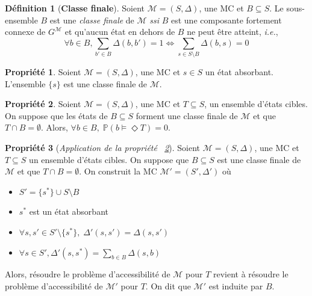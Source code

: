 \documentclass[12pt,a4paper]{report}
\theoremstyle{definition}%
\newtheorem{definition}{Définition}[chapter]
\newtheorem{propriete}{Propriété}[chapter]
\theoremstyle{remark}
\newcommand{\ssi}{\textit{ssi} }
\newcommand{\ie}{\textit{i.e.}, }
\let\labelitemi\labelitemii
\begin{document}
\begin{definition}[\textbf{Classe finale}]
	Soient $\mathcal{M} = (S, \Delta)$, une MC et $B \subseteq S$. Le sous-ensemble $B$ est une \textit{classe finale} de $\mathcal{M}$ \ssi $B$ est une composante fortement connexe de $G^\mathcal{M}$ et qu'aucun état en dehors de $B$ ne peut être atteint, \ie
	\[\forall b \in B, \sum_{b' \in B} \Delta(b, b') = 1 \iff \sum_{s \in S \setminus B} \Delta(b, s) = 0\]
\end{definition}

\begin{propriete}
		Soient $\mathcal{M}=(S, \Delta)$, une MC et $s \in S$ un état absorbant. L'ensemble $\{s\}$ est une classe finale de $\mathcal{M}$.
\end{propriete}

\begin{propriete}\label{BSCC-tip1}
	Soient $\mathcal{M} = (S, \Delta)$, une MC et $T \subseteq S$, un ensemble d'états cibles. On suppose que les états de $B \subseteq S$ forment une classe finale de $\mathcal{M}$ et que $T \cap B = \emptyset$. Alors, $\forall b \in B, \; \mathbb{P}(b \models \Diamond T) = 0$.
\end{propriete}

\begin{propriete}[\textit{Application de la propriété ~\ref{BSCC-tip1}}]\label{Bscc-application} Soient $\mathcal{M} = (S, \Delta)$, une MC et $T \subseteq S$ un ensemble d'états cibles. On suppose que $B \subseteq S$ est une classe finale de $\mathcal{M}$ et que $T \cap B = \emptyset$. On construit la MC $\mathcal{M}' = (S', \Delta')$ où 
\begin{itemize}
\renewcommand{\labelitemi}{\tiny$\bullet$}
\item $S' = \{s^*\} \cup S \setminus B$
\item $s^*$ est un état absorbant
\item $\forall s, s' \in S' \setminus \{s^*\}, \; \Delta'(s, s') = \Delta(s, s')$
\item $ \forall s \in S', \Delta'(s, s^*) = \sum_{b \in B} \Delta(s, b)$
\end{itemize}
Alors, résoudre le problème d'accessibilité de $\mathcal{M}$ pour $T$ revient à résoudre le problème d'accessibilité de $\mathcal{M}'$ pour $T$. On dit que $\mathcal{M'}$ est induite par $B$.
\end{propriete}
	
\end{document}
